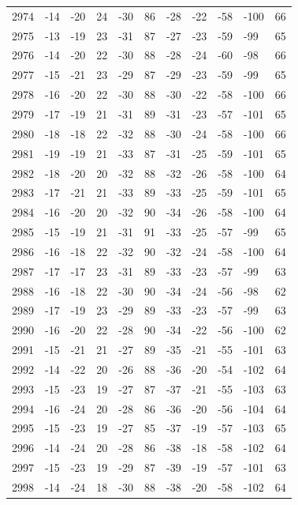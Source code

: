 \begin{table}[H]
\begin{tabular}{lllllllllll}
2974 & -14 & -20 & 24 & -30 & 86 & -28 & -22 & -58 & -100 & 66 \\
2975 & -13 & -19 & 23 & -31 & 87 & -27 & -23 & -59 & -99 & 65 \\
2976 & -14 & -20 & 22 & -30 & 88 & -28 & -24 & -60 & -98 & 66 \\
2977 & -15 & -21 & 23 & -29 & 87 & -29 & -23 & -59 & -99 & 65 \\
2978 & -16 & -20 & 22 & -30 & 88 & -30 & -22 & -58 & -100 & 66 \\
2979 & -17 & -19 & 21 & -31 & 89 & -31 & -23 & -57 & -101 & 65 \\
2980 & -18 & -18 & 22 & -32 & 88 & -30 & -24 & -58 & -100 & 66 \\
2981 & -19 & -19 & 21 & -33 & 87 & -31 & -25 & -59 & -101 & 65 \\
2982 & -18 & -20 & 20 & -32 & 88 & -32 & -26 & -58 & -100 & 64 \\
2983 & -17 & -21 & 21 & -33 & 89 & -33 & -25 & -59 & -101 & 65 \\
2984 & -16 & -20 & 20 & -32 & 90 & -34 & -26 & -58 & -100 & 64 \\
2985 & -15 & -19 & 21 & -31 & 91 & -33 & -25 & -57 & -99 & 65 \\
2986 & -16 & -18 & 22 & -32 & 90 & -32 & -24 & -58 & -100 & 64 \\
2987 & -17 & -17 & 23 & -31 & 89 & -33 & -23 & -57 & -99 & 63 \\
2988 & -16 & -18 & 22 & -30 & 90 & -34 & -24 & -56 & -98 & 62 \\
2989 & -17 & -19 & 23 & -29 & 89 & -33 & -23 & -57 & -99 & 63 \\
2990 & -16 & -20 & 22 & -28 & 90 & -34 & -22 & -56 & -100 & 62 \\
2991 & -15 & -21 & 21 & -27 & 89 & -35 & -21 & -55 & -101 & 63 \\
2992 & -14 & -22 & 20 & -26 & 88 & -36 & -20 & -54 & -102 & 64 \\
2993 & -15 & -23 & 19 & -27 & 87 & -37 & -21 & -55 & -103 & 63 \\
2994 & -16 & -24 & 20 & -28 & 86 & -36 & -20 & -56 & -104 & 64 \\
2995 & -15 & -23 & 19 & -27 & 85 & -37 & -19 & -57 & -103 & 65 \\
2996 & -14 & -24 & 20 & -28 & 86 & -38 & -18 & -58 & -102 & 64 \\
2997 & -15 & -23 & 19 & -29 & 87 & -39 & -19 & -57 & -101 & 63 \\
2998 & -14 & -24 & 18 & -30 & 88 & -38 & -20 & -58 & -102 & 64 \\

\end{tabular}
\end{table}
